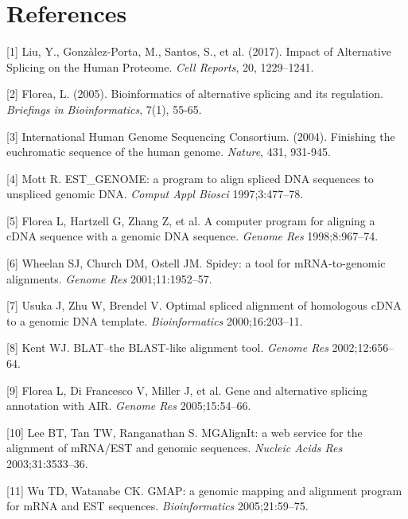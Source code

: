 \documentclass[12pt,a4paper]{article}
\begin{document}
\section{References}

[1] Liu, Y., Gonzàlez-Porta, M., Santos, S., et al. (2017). Impact of Alternative Splicing on the Human Proteome. \textit{Cell Reports}, 20, 1229–1241.

[2] Florea, L. (2005). Bioinformatics of alternative splicing and its regulation. \textit{Briefings in Bioinformatics}, 7(1), 55-65.

[3] International Human Genome Sequencing Consortium. (2004). Finishing the euchromatic sequence of the human genome. \textit{Nature}, 431, 931-945.

[4] Mott R. EST\_GENOME: a program to align spliced DNA sequences to unspliced genomic DNA. \textit{Comput Appl Biosci} 1997;3:477–78.

[5] Florea L, Hartzell G, Zhang Z, et al. A computer program for aligning a cDNA sequence with a genomic DNA sequence. \textit{Genome Res} 1998;8:967–74.

[6] Wheelan SJ, Church DM, Ostell JM. Spidey: a tool for mRNA-to-genomic alignments. \textit{Genome Res} 2001;11:1952–57.

[7] Usuka J, Zhu W, Brendel V. Optimal spliced alignment of homologous cDNA to a genomic DNA template. \textit{Bioinformatics} 2000;16:203–11.

[8] Kent WJ. BLAT–the BLAST-like alignment tool. \textit{Genome Res} 2002;12:656–64.

[9] Florea L, Di Francesco V, Miller J, et al. Gene and alternative splicing annotation with AIR. \textit{Genome Res} 2005;15:54–66.

[10] Lee BT, Tan TW, Ranganathan S. MGAlignIt: a web service for the alignment of mRNA/EST and genomic sequences. \textit{Nucleic Acids Res} 2003;31:3533–36.

[11] Wu TD, Watanabe CK. GMAP: a genomic mapping and alignment program for mRNA and EST sequences. \textit{Bioinformatics} 2005;21:59–75.
\end{document}
